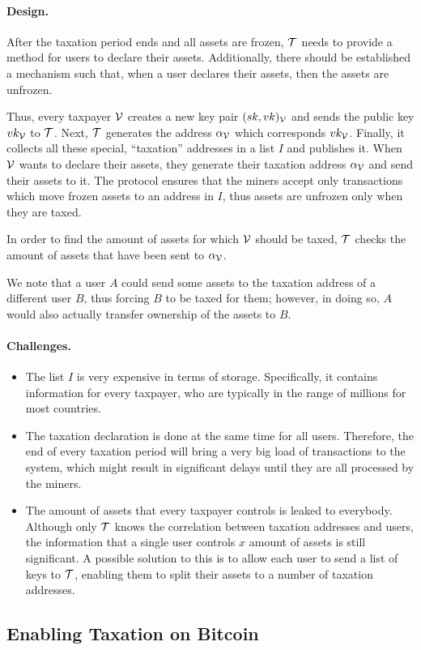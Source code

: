 \paragraph{Design.}

After the taxation period ends and all assets are frozen, $\mathcal{T}$ needs to
provide a method for users to declare their assets. Additionally, there should
be established a mechanism such that, when a user declares their assets, then
the assets are unfrozen.

Thus, every taxpayer $\mathcal{V}$ creates a new key pair $(sk, vk)_\mathcal{V}$ and sends
the public key $vk_\mathcal{V}$ to $\mathcal{T}$. Next, $\mathcal{T}$ generates the
address $\alpha_\mathcal{V}$ which corresponds $vk_\mathcal{V}$. Finally, it
collects all these special, ``taxation'' addresses in a list $I$ and publishes
it.  When $\mathcal{V}$ wants to declare their assets, they generate their taxation
address $\alpha_\mathcal{V}$ and send their assets to it. The protocol ensures that
the miners accept only transactions which move frozen assets to an address in
$I$, thus assets are unfrozen only when they are taxed.

In order to find the amount of assets for which $\mathcal{V}$ should be taxed,
$\mathcal{T}$ checks the amount of assets that have been sent to $\alpha_\mathcal{V}$.

We note that a user $A$ could send some assets to the taxation address of a
different user $B$, thus forcing $B$ to be taxed for them; however, in doing
so, $A$ would also actually transfer ownership of the assets to $B$.

\paragraph{Challenges.}

\begin{itemize}
    \item The list $I$ is very expensive in terms of storage. Specifically, it
        contains information for every taxpayer, who are typically in the range
        of millions for most countries.
    \item The taxation declaration is done at the same time for all users.
        Therefore, the end of every taxation period will bring a very big load
        of transactions to the system, which might result in significant delays
        until they are all processed by the miners.
    \item The amount of assets that every taxpayer controls is leaked to
        everybody. Although only $\mathcal{T}$ knows the correlation between
        taxation addresses and users, the information that a single user
        controls \eg $x$ amount of assets is still significant. A possible
        solution to this is to allow each user to send a list of keys to
        $\mathcal{T}$, enabling them to split their assets to a number of taxation
        addresses.
\end{itemize}

\subsection{Enabling Taxation on Bitcoin}\label{subsec:tax-bitcoin}

